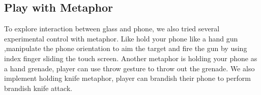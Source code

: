 \documentclass{sigchi}
\begin{document}
\subsection{Play with Metaphor}
To explore interaction between glass and phone, we also tried several experimental control with metaphor. Like hold your phone like a hand gun ,manipulate the phone orientation to aim the target and fire the gun by using index finger sliding the touch screen. Another metaphor is holding your phone as a hand grenade, player can use throw gesture to throw out the grenade. We also implement holding knife metaphor, player can brandish their phone to perform brandish knife attack.




\end{document}
